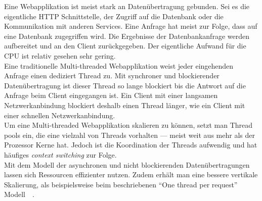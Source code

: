 \pagebreak

Eine Webapplikation ist meist stark an Datenübertragung gebunden. Sei es die eigentliche HTTP Schnittstelle, der Zugriff auf die Datenbank oder die Kommunikation mit anderen Services. Eine Anfrage hat meist zur Folge, dass auf eine Datenbank zugegriffen wird. Die Ergebnisse der Datenbankanfrage werden aufbereitet und an den Client zurückgegeben. Der eigentliche Aufwand für die CPU ist relativ gesehen sehr gering.\\
Eine traditionelle Multi-threaded Webapplikation weist jeder eingehenden Anfrage einen dediziert Thread zu. Mit synchroner und blockierender Datenübertragung ist dieser Thread so lange blockiert bis die Antwort auf die Anfrage beim Client eingegangen ist. Ein Client mit einer langsamen Netzwerkanbindung blockiert deshalb einen Thread länger, wie ein Client mit einer schnellen Netzwerkanbindung.\\
Um eine Multi-threaded Webapplikation skalieren zu können, setzt man Thread pools ein, die eine vielzahl von Threads vorhalten --- meist weit aus mehr als der Prozessor Kerne hat. Jedoch ist die Koordination der Threads aufwendig und hat häufiges \textit{context switching} zur Folge.\\
Mit dem Modell der asynchronen und nicht blockierenden Datenübertragungen lassen sich Ressourcen effizienter nutzen. Zudem erhält man eine bessere vertikale Skalierung, als beispielsweise beim beschriebenen \enquote{One thread per request} Modell~\cite[S.~171]{butcher_seven_2014}~\cite[S.~76]{erb_concurrent_2012}.

\pagebreak

